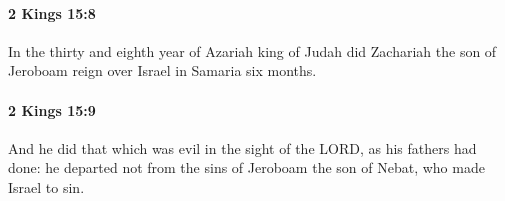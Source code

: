 		\paragraph{2 Kings 15:8} %
			\label{2KINGS-15-8}

			In the thirty and eighth year of Azariah king of Judah did Zachariah the son of Jeroboam reign over Israel in Samaria six months.


		\paragraph{2 Kings 15:9} %
			\label{2KINGS-15-9}

			And he did that which was evil in the sight of the LORD, as his fathers had done: he departed not from the sins of Jeroboam the son of Nebat, who made Israel to sin.


